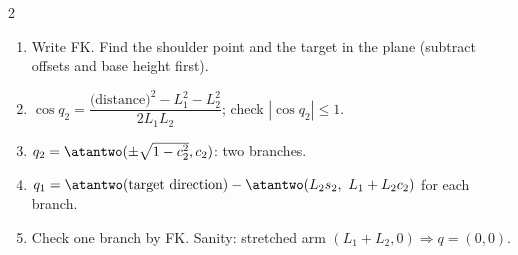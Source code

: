 \begin{multicols}{2}
\begin{recipe}
\label{w3:two}
\begin{enumerate}
\item Write FK. Find the shoulder point and the target in the plane (subtract offsets and base height first).
\item $\cos q_2=\dfrac{\text{(distance)}^2-L_1^2-L_2^2}{2L_1L_2}$; check $|\cos q_2|\le1$.
\item $q_2=\atantwo(\pm\sqrt{1-c_2^2},c_2)$: two branches.
\item $q_1=\atantwo(\text{target direction})-\atantwo(L_2s_2,\ L_1+L_2c_2)$ for each branch.
\item Check one branch by FK. Sanity: stretched arm $(L_1+L_2,0)\Rightarrow q=(0,0)$.
\end{enumerate}
\end{recipe}


\end{multicols}
